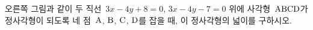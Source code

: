 \noindent\begin{minipage}[t]{0.58\linewidth}\vspace{0pt}\raggedright 오른쪽 그림과 같이 두 직선~$3x-4y+8=0$, $3x-4y-7=0$ 위에 사각형~$\mathrm{ABCD}$가 정사각형이 되도록 네 점~$\mathrm{A}$, $\mathrm{B}$, $\mathrm{C}$, $\mathrm{D}$를 잡을 때, 이 정사각형의 넓이를 구하시오.\end{minipage}\hfill\begin{minipage}[t]{0.4\linewidth}\vspace{0pt}\centering \resizebox{\ifdim\width>\linewidth\linewidth\else\width\fi}{!}{}\end{minipage}\par
